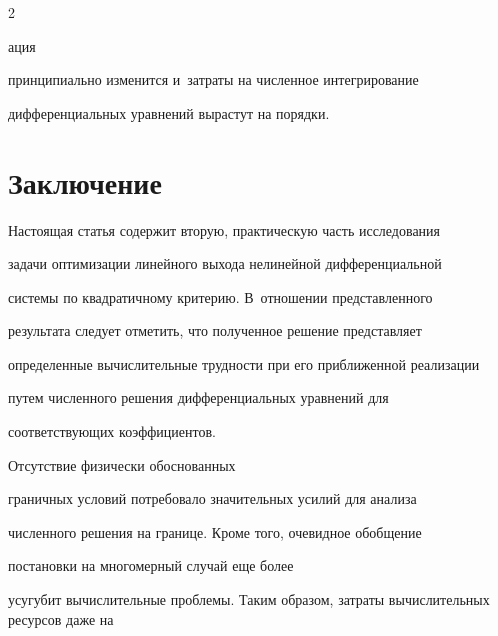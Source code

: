 \begin{multicols}{2}





\noindent


ация 


принципиально изменится и~затраты на чис\-лен\-ное интегрирование 


дифференциальных уравнений вырастут на порядки.





\vspace*{-9pt}











\section{Заключение}





\vspace*{-2pt}





     Настоящая статья содержит вторую, практическую часть исследования 


задачи оптимизации линейного выхода нелинейной дифференциальной 


системы по квадратичному критерию. В~отношении представленного 


результата следует отметить, что полученное решение представляет 


определенные вычислительные трудности при его приближенной реализации 


путем численного решения дифференциальных уравнений для 


соответствующих коэффициентов. 





Отсутствие физически обоснованных 


граничных условий потребовало значительных усилий для анализа 


численного решения на границе. Кроме того, очевидное обобщение 


постановки на многомерный случай  еще более 


усугубит вычислительные проблемы. Таким образом, затраты вы\-чис\-ли\-тель\-ных ресурсов даже на 



\end{multicols}
